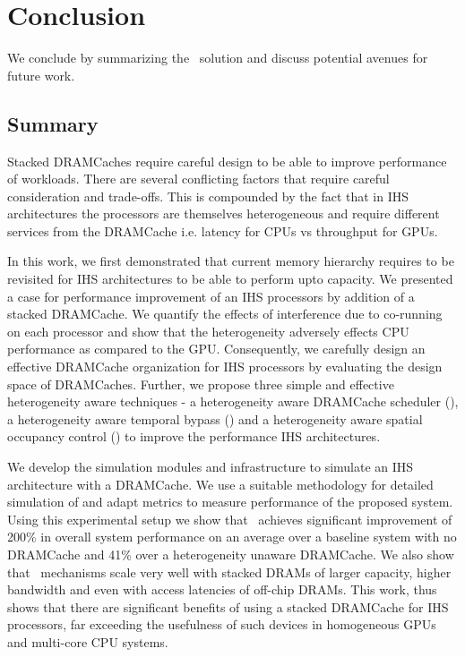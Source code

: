 \chapter{Conclusion} \label{chap:conclusion}
We conclude by summarizing the \cachename\ solution and discuss potential avenues for future work.
\section{Summary}
Stacked DRAMCaches require careful design to be able to improve performance of workloads. There are several conflicting factors that require careful consideration and trade-offs. This is compounded by the fact that in IHS architectures the processors are themselves heterogeneous and require different services from the DRAMCache i.e. latency for CPUs vs throughput for GPUs.
\par In this work, we first demonstrated that current memory hierarchy requires to be revisited for IHS architectures to be able to perform upto capacity. We presented a case for performance improvement of an IHS processors by addition of a stacked DRAMCache. 
We quantify the effects of interference due to co-running on each processor and show that the heterogeneity adversely effects CPU performance as compared to the GPU. 
Consequently, we carefully design an effective DRAMCache organization for IHS processors by evaluating the design space of DRAMCaches.
Further, we propose three simple and effective heterogeneity aware techniques - a heterogeneity aware DRAMCache scheduler (\prioname), a heterogeneity aware temporal bypass (\bypassname) and a heterogeneity aware spatial occupancy control (\chaining) to improve the performance IHS architectures.
\par We develop the simulation modules and infrastructure to simulate an IHS architecture with a DRAMCache. We use a suitable methodology for detailed simulation of \cachename and adapt metrics to measure performance of the proposed system. Using this experimental setup we show that 
\cachename\ achieves significant improvement of 200\% in overall system performance on an average over a baseline system with no DRAMCache and 41\% over a heterogeneity unaware DRAMCache. 
We also show that \cachename\ mechanisms scale very well with stacked DRAMs of larger capacity, higher bandwidth and even with access latencies of off-chip DRAMs.
This work, thus shows that there are significant benefits of using a stacked DRAMCache for IHS processors, far exceeding the usefulness of such devices in homogeneous GPUs and multi-core CPU systems.

